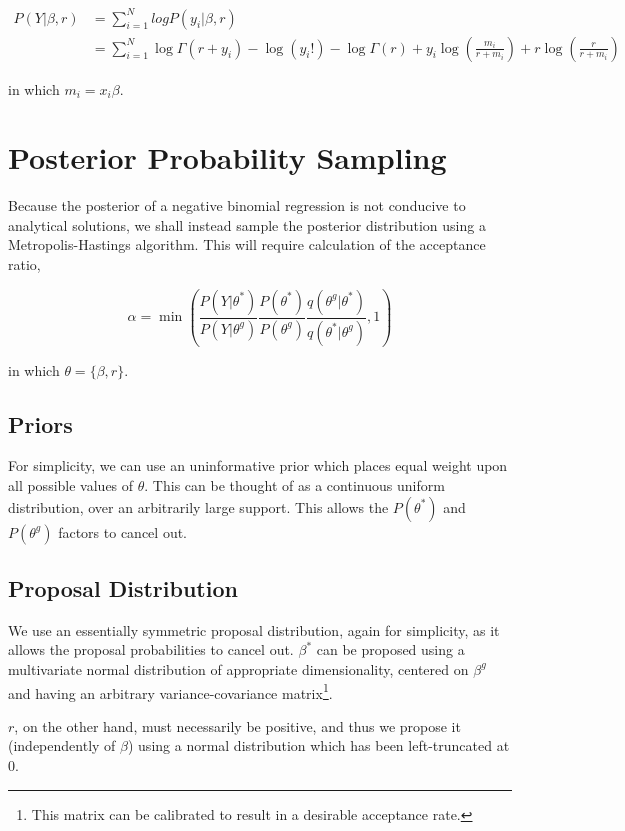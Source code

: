 \documentclass[12pt]{article}
\begin{document}
	\begin{align}
	P(Y|\beta, r) &= \sum_{i = 1}^{N} log P(y_i|\beta, r)\\
	&= \sum_{i = 1}^{N} \log \Gamma(r + y_i) - \log(y_i!) - \log \Gamma(r) + y_i \log(\frac{m_i}{r + m_i}) + r \log(\frac{r}{r + m_i})
	\end{align}
	
	in which $m_i = x_i \beta$.
	
	\section{Posterior Probability Sampling}
	Because the posterior of a negative binomial regression is not conducive to analytical solutions, we shall instead sample the posterior distribution using a Metropolis-Hastings algorithm. This will require calculation of the acceptance ratio, 
	
	\begin{equation}
	\alpha = \min\left( \frac{P(Y|\theta^*)}{P(Y|\theta^g)}\frac{P(\theta^*)}{P(\theta^g)}\frac{q(\theta^g|\theta^*)}{q(\theta^*|\theta^g)}, 1\right)
	\end{equation}
	
	in which $\theta = \{\beta, r\}$.
	
	\subsection{Priors}
	For simplicity, we can use an uninformative prior which places equal weight upon all possible values of $\theta$. This can be thought of as a continuous uniform distribution, over an arbitrarily large support. This allows the $P(\theta^*)$ and $P(\theta^g)$ factors to cancel out. 
	
	\subsection{Proposal Distribution}
	We use an essentially symmetric proposal distribution, again for simplicity, as it allows the proposal probabilities to cancel out. $\beta^*$ can be proposed using a multivariate normal distribution of appropriate dimensionality, centered on $\beta^g$ and having an arbitrary variance-covariance matrix\footnote{This matrix can be calibrated to result in a desirable acceptance rate.}.
	
	$r$, on the other hand, must necessarily be positive, and thus we propose it (independently of $\beta$) using a normal distribution which has been left-truncated at 0.
	
\end{document}
